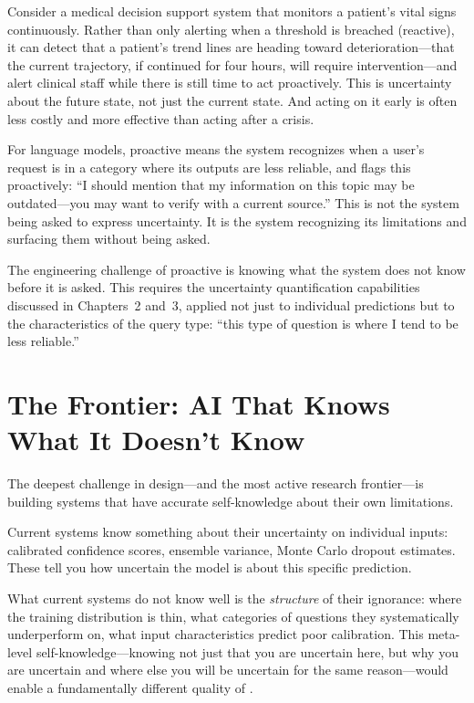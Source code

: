 Consider a medical decision support system that monitors a patient's vital signs continuously. Rather than only alerting when a threshold is breached (reactive), it can detect that a patient's trend lines are heading toward deterioration---that the current trajectory, if continued for four hours, will require intervention---and alert clinical staff while there is still time to act proactively. This is uncertainty about the future state, not just the current state. And acting on it early is often less costly and more effective than acting after a crisis.

For language models, proactive \hitl means the system recognizes when a user's request is in a category where its outputs are less reliable, and flags this proactively: ``I should mention that my information on this topic may be outdated---you may want to verify with a current source.'' This is not the system being asked to express uncertainty. It is the system recognizing its limitations \autocite{kadavath2022language} and surfacing them without being asked.

The engineering challenge of proactive \hitl is knowing what the system does not know before it is asked. This requires the uncertainty quantification capabilities discussed in Chapters~2 and~3, applied not just to individual predictions but to the characteristics of the query type: ``this type of question is where I tend to be less reliable.''

\section{The Frontier: AI That Knows What It Doesn't Know}
\label{sec:ch17-frontier}

The deepest challenge in \hitl design---and the most active research frontier---is building \ai systems that have accurate self-knowledge about their own limitations.

Current systems know something about their uncertainty on individual inputs: calibrated confidence scores, ensemble variance, Monte Carlo dropout estimates. These tell you how uncertain the model is about this specific prediction.

What current systems do not know well is the \emph{structure} of their ignorance: where the training distribution is thin, what categories of questions they systematically underperform on, what input characteristics predict poor calibration. This meta-level self-knowledge---knowing not just that you are uncertain here, but why you are uncertain and where else you will be uncertain for the same reason---would enable a fundamentally different quality of \hitl.


